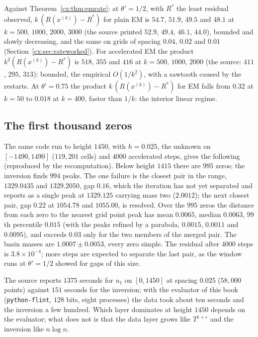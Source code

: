Against Theorem~\ref{cx:thm:emrate}: at $\theta'=1/2$, with $R^*$ the least residual observed, $k\,(R(x^{(k)})-R^*)$ for plain EM is $54.7$, $51.9$, $49.5$ and $48.1$ at $k=500$, $1000$, $2000$, $3000$ (the source printed $52.9$, $49.4$, $46.1$, $44.0$), bounded and slowly decreasing, and the same on grids of spacing $0.04$, $0.02$ and $0.01$ (Section~\ref{cx:sec:rateworked}). For accelerated EM the product $k^2(R(x^{(k)})-R^*)$ is $518$, $355$ and $416$ at $k=500$, $1000$, $2000$ (the source: $411$, $295$, $313$): bounded, the empirical $O(1/k^2)$, with a sawtooth caused by the restarts. At $\theta'=0.75$ the product $k\,(R(x^{(k)})-R^*)$ for EM falls from $0.32$ at $k=50$ to $0.018$ at $k=400$, faster than $1/k$: the interior linear regime.

\subsection{The first thousand zeros}\label{cx:sec:thousand}

The same code run to height $1450$, with $h=0.025$, the unknown on $[-1490,1490]$ ($119{,}201$ cells) and $4000$ accelerated steps, gives the following (reproduced by the recomputation). Below height $1415$ there are $995$ zeros; the inversion finds $994$ peaks. The one failure is the closest pair in the range, $1329.0435$ and $1329.2050$, gap $0.16$, which the iteration has not yet separated and reports as a single peak at $1329.125$ carrying mass two ($2.0012$); the next closest pair, gap $0.22$ at $1054.78$ and $1055.00$, is resolved. Over the $995$ zeros the distance from each zero to the nearest grid point peak has mean $0.0065$, median $0.0063$, $99$th percentile $0.015$ (with the peaks refined by a parabola, $0.0015$, $0.0011$ and $0.0095$), and exceeds $0.03$ only for the two members of the merged pair. The basin masses are $1.0007\pm0.0053$, every zero simple. The residual after $4000$ steps is $3.8\times10^{-4}$; more steps are expected to separate the last pair, as the window runs at $\theta'=1/2$ showed for gaps of this size.

The source reports $1375$ seconds for $u_1$ on $[0,1450]$ at spacing $0.025$ ($58{,}000$ points) against $151$ seconds for the inversion; with the evaluator of this book (\texttt{python-flint}, $128$ bits, eight processes) the data took about ten seconds and the inversion a few hundred. Which layer dominates at height $1450$ depends on the evaluator; what does not is that the data layer grows like $T^{1+\varepsilon}$ and the inversion like $n\log n$.

